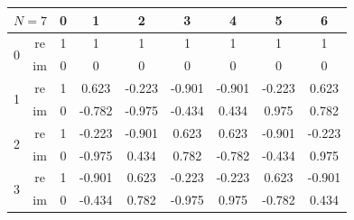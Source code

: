 \begin{center}
	\begin{tabular}{| c c c c c c c c c |}
		\hline
		\multicolumn{2}{|c}{$N=7$} & \multicolumn{1}{c}{ \tiny 0} & \multicolumn{1}{c}{ \tiny 1} & \multicolumn{1}{c}{ \tiny 2} & \multicolumn{1}{c}{ \tiny 3} & \multicolumn{1}{c}{ \tiny 4} & \multicolumn{1}{c}{ \tiny 5} & \multicolumn{1}{c|}{ \tiny 6}          \\
		\hline
		\hline
		\multirow{2}{*}{0}         & re                           & 1                            & 1                            & 1                            & 1                            & 1                            & 1                             & 1      \\
		                           & im                           & 0                            & 0                            & 0                            & 0                            & 0                            & 0                             & 0      \\
		\hline\hline
		\multirow{2}{*}{1}         & re                           & 1                            & 0.623                        & -0.223                       & -0.901                       & -0.901                       & -0.223                        & 0.623  \\
		                           & im                           & 0                            & -0.782                       & -0.975                       & -0.434                       & 0.434                        & 0.975                         & 0.782  \\
		\hline\hline
		\multirow{2}{*}{2}         & re                           & 1                            & -0.223                       & -0.901                       & 0.623                        & 0.623                        & -0.901                        & -0.223 \\
		                           & im                           & 0                            & -0.975                       & 0.434                        & 0.782                        & -0.782                       & -0.434                        & 0.975  \\
		\hline\hline
		\multirow{2}{*}{3}         & re                           & 1                            & -0.901                       & 0.623                        & -0.223                       & -0.223                       & 0.623                         & -0.901 \\
		                           & im                           & 0                            & -0.434                       & 0.782                        & -0.975                       & 0.975                        & -0.782                        & 0.434  \\

\end{tabular}
\end{center}
